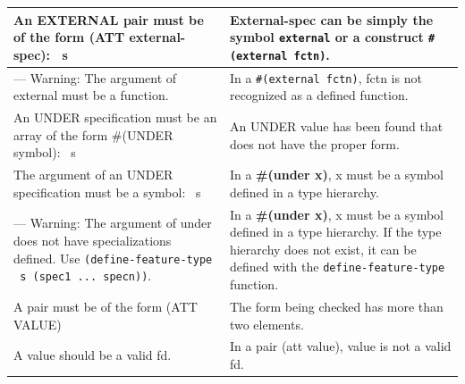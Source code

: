 \documentclass[10pt,a4paper]{report}
\begin{document}
\begin{center}
\begin{tabular}{ | p{3in} | p{3in} |}
An EXTERNAL pair must be of the form (ATT external-spec): ~s
&External-spec can be simply the symbol {\tt external} or a construct
{\tt \#(external fctn)}.  \\ \hline

--- Warning: The argument of external must be a function. &In a {\tt \#(external
fctn)}, fctn is not recognized as a defined function.  \\ \hline

An UNDER specification must be an array of the form \#(UNDER symbol): ~s
&An UNDER value has been found that does not have the proper form.  \\ \hline

The argument of an UNDER specification must be a symbol: ~s &In a 
{\bf \#(under x)}, x must be a symbol defined in a type hierarchy.  \\ \hline

--- Warning: The argument of under does not have specializations defined.
Use {\tt (define-feature-type ~s (spec1 ... specn))}. &In a 
{\bf \#(under x)}, x must be a symbol defined in a type hierarchy.  If the
type hierarchy does not exist, it can be defined with the
{\tt define-feature-type} function.  \\ \hline

A pair must be of the form (ATT VALUE) &The form being checked has more
than two elements.  \\ \hline

A value should be a valid fd. &In a pair (att value), value is not a valid
fd.  \\ \hline
\end{tabular}
\end{center}
\end{document}
